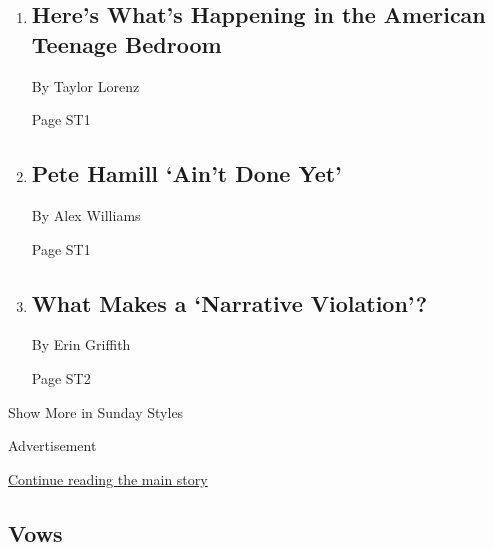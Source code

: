 \begin{enumerate}
\def\labelenumi{\arabic{enumi}.}
\item
  \href{/2019/11/29/style/the-clout.html}{}

  \hypertarget{heres-whats-happening-in-the-american-teenage-bedroom-1}{%
  \subsection{Here's What's Happening in the American Teenage
  Bedroom}\label{heres-whats-happening-in-the-american-teenage-bedroom-1}}

  By Taylor Lorenz

  Page ST1
\item
  \href{/2019/11/26/style/pete-hamill-brooklyn-book.html}{}

  \hypertarget{pete-hamill-aint-done-yet}{%
  \subsection{Pete Hamill `Ain't Done
  Yet'}\label{pete-hamill-aint-done-yet}}

  By Alex Williams

  Page ST1
\item
  \href{/2019/11/26/style/narrative-violation-venture-capital-tech.html}{}

  \hypertarget{what-makes-a-narrative-violation}{%
  \subsection{What Makes a `Narrative
  Violation'?}\label{what-makes-a-narrative-violation}}

  By Erin Griffith

  Page ST2
\end{enumerate}

Show More in Sunday Styles

Advertisement

\protect\hyperlink{after-mid7}{Continue reading the main story}

\hypertarget{vows}{%
\subsection{Vows}\label{vows}}

